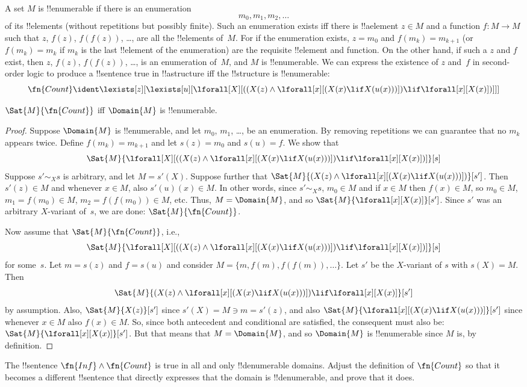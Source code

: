 \documentclass[../../../include/open-logic-section]{subfiles}
\begin{document}
A set $M$ is !!{enumerable} if there is an enumeration
\[
m_0, m_1, m_2, \dots
\]
of its !!{element}s (without repetitions but possibly finite).  Such an enumeration exists
iff there is !!a{element} $z \in M$ and a function $f\colon M \to M$
such that $z$, $f(z)$, $f(f(z))$, \dots, are all the !!{element}s of~$M$. For
if the enumeration exists, $z = m_0$ and $f(m_k) = m_{k+1}$ (or
$f(m_k) = m_k$ if $m_k$ is the last !!{element} of the enumeration)
are the requisite !!{element} and function. On the other hand, if such
a $z$ and $f$ exist, then $z$, $f(z)$, $f(f(z))$, \dots, is an
enumeration of~$M$, and $M$ is !!{enumerable}.  We can express the
existence of $z$ and~$f$ in second-order logic to produce a
!!{sentence} true in !!a{structure} iff the !!{structure} is
!!{enumerable}:
\[
\fn{Count} \ident
\lexists[z][\lexists[u][\lforall[X][((X(z) \land
      \lforall[x][(X(x) \lif X(u(x)))]) \lif \lforall[x][X(x)])]]]
\]

\begin{prop}
$\Sat{M}{\fn{Count}}$ iff $\Domain{M}$ is !!{enumerable}.
\end{prop}

\begin{proof}
Suppose $\Domain{M}$ is !!{enumerable}, and let $m_0$, $m_1$, \dots, be an
enumeration. By removing repetitions we can guarantee that no $m_k$
appears twice. Define $f(m_k) = m_{k+1}$ and let $s(z) = m_0$ and
$s(u) = f$. We show that
\[
\Sat{M}{\lforall[X][((X(z) \land \lforall[x][(X(x) \lif X(u(x)))])
    \lif \lforall[x][X(x)])]}[s]
\]
Suppose $s' \sim_X s$ is arbitrary, and let $M = s'(X)$. Suppose
further that $\Sat{M}{(X(z) \land \lforall[x][(X(x) \lif
    X(u(x)))])}[s']$. Then $s'(z) \in M$ and whenever $x \in M$, also
$s'(u)(x) \in M$. In other words, since $s' \sim_X s$, $m_0 \in M$ and
if $x \in M$ then $f(x) \in M$, so $m_0 \in M$, $m_1 = f(m_0) \in M$,
$m_2 = f(f(m_0)) \in M$, etc. Thus, $M = \Domain{M}$, and so
$\Sat{M}{\lforall[x][X(x)]}[s']$. Since $s'$ was an arbitrary
$X$-variant of~$s$, we are done: $\Sat{M}{\fn{Count}}$.

Now assume that $\Sat{M}{\fn{Count}}$, i.e., 
\[
\Sat{M}{\lforall[X][((X(z) \land \lforall[x][(X(x) \lif X(u(x)))])
    \lif \lforall[x][X(x)])]}[s]
\]
for some~$s$. Let $m = s(z)$ and $f = s(u)$ and consider $M = \{m,
f(m), f(f(m)), \dots\}$. Let $s'$ be the $X$-variant of $s$ with $s(X)
= M$. Then
\[
\Sat{M}{(X(z) \land \lforall[x][(X(x) \lif X(u(x)))])
    \lif \lforall[x][X(x)]}[s']
\]
by assumption. Also, $\Sat{M}{X(z)}[s']$ since $s'(X) = M \ni m =
s'(z)$, and also $\Sat{M}{\lforall[x][(X(x) \lif X(u(x)))]}[s']$ since
whenever $x \in M$ also $f(x) \in M$. So, since both antecedent and
conditional are satisfied, the consequent must also be:
$\Sat{M}{\lforall[x][X(x)]}[s']$. But that means that $M =
\Domain{M}$, and so $\Domain{M}$ is !!{enumerable} since $M$ is, by
definition.
\end{proof}

\begin{prob}
The !!{sentence} $\fn{Inf} \land \fn{Count}$ is true in all and only
!!{denumerable} domains.  Adjust the definition of $\fn{Count}$ so
that it becomes a different !!{sentence} that directly expresses that
the domain is !!{denumerable}, and prove that it does.
\end{prob}
\end{document}

